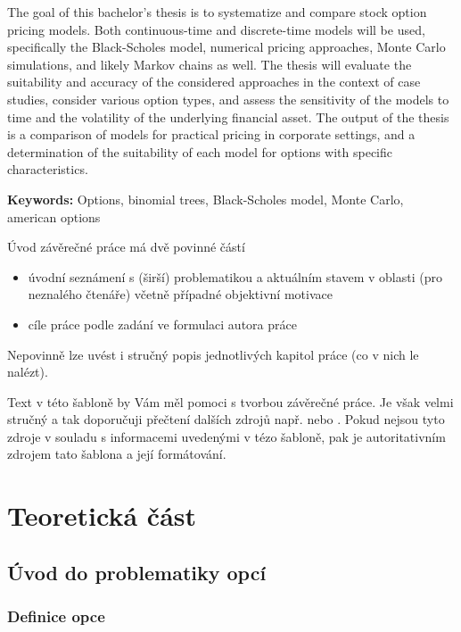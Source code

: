 \documentclass[male,czech,api_bc]{kitheses}
\begin{document}
The goal of this bachelor's thesis is to systematize and compare stock option pricing models. Both continuous-time and discrete-time models will be used, specifically the Black-Scholes model, numerical pricing approaches, Monte Carlo simulations, and likely Markov chains as well. The thesis will evaluate the suitability and accuracy of the considered approaches in the context of case studies, consider various option types, and assess the sensitivity of the models to time and the volatility of the underlying financial asset. The output of the thesis is a comparison of models for practical pricing in corporate settings, and a determination of the suitability of each model for options with specific characteristics.

\textbf{Keywords:} Options, binomial trees, Black-Scholes model, Monte Carlo, american options

\tableofcontents


Úvod závěrečné práce má dvě povinné částí

\begin{itemize}
\item úvodní seznámení s (širší) problematikou a aktuálním stavem v oblasti (pro neznalého čtenáře) včetně případné objektivní motivace 
\item cíle práce podle zadání ve formulaci autora práce
\end{itemize}

Nepovinně lze uvést i stručný popis jednotlivých kapitol práce (co v nich le nalézt).

Text v této šabloně by Vám měl pomoci s tvorbou závěrečné práce. Je však velmi stručný a tak doporučuji přečtení dalších zdrojů např. \cite{Katuscakc2008} nebo 
\cite{Ticha2009}. Pokud nejsou tyto zdroje v souladu s informacemi uvedenými v tézo šabloně, pak je autoritativním zdrojem tato šablona a její formátování.

\chapter{Teoretická část}

\section{Úvod do problematiky opcí}

\subsection{Definice opce}
\end{document}
